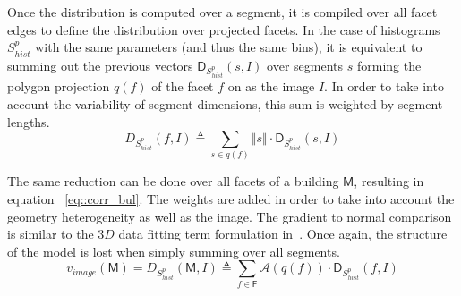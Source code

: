 \documentclass[runningheads]{llncs}
\begin{document}
\begin{figure}
	\begin{center}
	\end{center}
    \vspace{-4em}
\end{figure}

Once the distribution is computed over a segment, it is compiled over all facet edges to define the distribution over projected facets. In the case of histograms $S_{hist}^p$ with the same parameters (and thus the same bins), it is equivalent to summing out the previous vectors $\mathsf{D}_{S_{hist}^p}(s, I)$ over segments $s$ forming the polygon projection $q(f)$ of the facet $f$ on as the image $I$. In order to take into account the variability of segment dimensions, this sum is weighted by segment lengths.
\begin{equation}
	\label{eq::corr_fac}
	D_{S_{hist}^p}(f, I) \triangleq \sum_{s \in q(f)} \Vert s \Vert \cdot \mathsf{D}_{S_{hist}^p}(s, I)
\end{equation}

The same reduction can be done over all facets of a building $\mathsf{M}$, resulting in equation ~\ref{eq::corr_bul}. The weights are added in order to take into account the geometry heterogeneity as well as the image. The gradient to normal comparison is similar to the $3D$ data fitting term formulation in~\cite{li2016boxfitting}. Once again, the structure of the model is lost when simply summing over all segments.
\begin{equation}
	\label{eq::corr_bul}
	v_{image}(\mathsf{M}) = D_{S_{hist}^p}(\mathsf{M}, I) \triangleq \sum_{f \in \mathsf{F}} \mathscr{A}(q(f)) \cdot \mathsf{D}_{S_{hist}^p}(f, I)
\end{equation}
\end{document}
